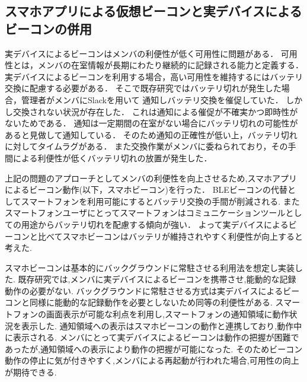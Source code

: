 
\subsection{スマホアプリによる仮想ビーコンと実デバイスによるビーコンの併用}


実デバイスによるビーコンはメンバの利便性が低く可用性に問題がある．
可用性とは，メンバの在室情報が長期にわたり継続的に記録される能力と定義する．
実デバイスによるビーコンを利用する場合，高い可用性を維持するにはバッテリ交換に配慮する必要がある．
そこで既存研究ではバッテリ切れが発生した場合，管理者がメンバにSlackを用いて
通知しバッテリ交換を催促していた．
しかし交換されない状況が存在した．
これは通知による催促が不確実かつ即時性がないためである．
通知は一定期間の在室がない場合にバッテリ切れの可能性があると見做して通知している．
そのため通知の正確性が低い上，バッテリ切れに対してタイムラグがある．
また交換作業がメンバに委ねられており，その手間による利便性が低くバッテリ切れの放置が発生した．


上記の問題のアプローチとしてメンバの利便性を向上させるため,スマホアプリによるビーコン動作(以下，スマホビーコン)を行った．
BLEビーコンの代替としてスマートフォンを利用可能にするとバッテリ交換の手間が削減される.
またスマートフォンユーザにとってスマートフォンはコミュニケーションツールとしての用途からバッテリ切れを配慮する傾向が強い．
よって実デバイスによるビーコンと比べてスマホビーコンはバッテリが維持されやすく利便性が向上すると考えた.

スマホビーコンは基本的にバックグラウンドに常駐させる利用法を想定し実装した.
既存研究では,メンバに実デバイスによるビーコンを携帯させ,能動的な記録動作の必要がない.
バックグラウンドに常駐させる方式は実デバイスによるビーコンと同様に能動的な記録動作を必要としないため同等の利便性がある.
スマートフォンの画面表示が可能な利点を利用し,スマートフォンの通知領域に動作状況を表示した.
通知領域への表示はスマホビーコンの動作と連携しており,動作中に表示される.
メンバにとって実デバイスによるビーコンは動作の把握が困難であったが,通知領域への表示により動作の把握が可能になった.
そのためビーコン動作の停止に気が付きやすく,メンバによる再起動が行われた場合,可用性の向上が期待できる.







